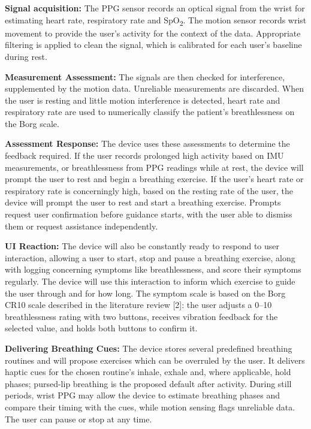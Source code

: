 \noindent\textbf{Signal acquisition:} The PPG sensor records an optical signal from the wrist for estimating heart rate, respiratory rate and SpO\textsubscript{2}. The motion sensor records wrist movement to provide the user's activity for the context of the data. Appropriate filtering is applied to clean the signal, which is calibrated for each user's baseline during rest.

\noindent\textbf{Measurement Assessment:} The signals are then checked for interference, supplemented by the motion data. Unreliable measurements are discarded. When the user is resting and little motion interference is detected, heart rate and respiratory rate are used to numerically classify the patient's breathlessness on the Borg scale.

\noindent\textbf{Assessment Response:} The device uses these assessments to determine the feedback required. If the user records prolonged high activity based on IMU measurements, or breathlessness from PPG readings while at rest, the device will prompt the user to rest and begin a breathing exercise. If the user's heart rate or respiratory rate is concerningly high, based on the resting rate of the user, the device will prompt the user to rest and start a breathing exercise. Prompts request user confirmation before guidance starts, with the user able to dismiss them or request assistance independently.

\noindent\textbf{UI Reaction:} The device will also be constantly ready to respond to user interaction, allowing a user to start, stop and pause a breathing exercise, along with logging concerning symptoms like breathlessness, and score their symptoms regularly. The device will use this interaction to inform which exercise to guide the user through and for how long. The symptom scale is based on the Borg CR10 scale described in the literature review [2]: the user adjusts a 0--10 breathlessness rating with two buttons, receives vibration feedback for the selected value, and holds both buttons to confirm it.

\noindent\textbf{Delivering Breathing Cues:} The device stores several predefined breathing routines and will propose exercises which can be overruled by the user. It delivers haptic cues for the chosen routine's inhale, exhale and, where applicable, hold phases; pursed-lip breathing is the proposed default after activity. During still periods, wrist PPG may allow the device to estimate breathing phases and compare their timing with the cues, while motion sensing flags unreliable data. The user can pause or stop at any time.

